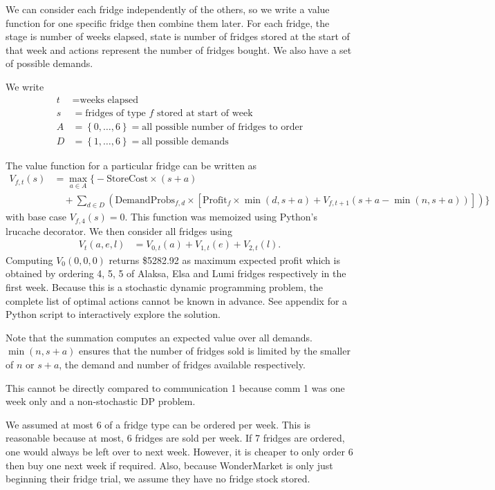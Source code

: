 \documentclass[11pt,a4paper]{article}
\begin{document}
We can consider each fridge independently of the others, so we write a value function 
for one specific fridge then combine them later. For each fridge, 
the stage is number of weeks elapsed, state is number of fridges stored at 
the start of that week and actions represent the number of fridges bought. We also 
have a set of possible demands.

We write 
\begin{align*}
    t &= \text{weeks elapsed} \\ 
    s &= \text{fridges of type $f$ stored at start of week} \\ 
    A &= \left\{ 0, \ldots, 6\right\} = \text{all possible number of fridges to order} \\ 
    D &= \left\{ 1, \ldots, 6\right\} = \text{all possible demands} 
\end{align*}

The value function for a particular fridge can be written as 
\begin{align*}
    V_{f,t}(s) &= \max_{a \in A} 
    \Big\{ -\mathrm{StoreCost}\times(s+a) \\ 
        & \quad + \sum_{d \in D} \left(\mathrm{DemandProbs}_{f,d} \times \left[\mathrm{Profit}_f\times\min(d, s+a)+  V_{f,t+1}(s+a-\min(n, s+a)) \right]\right)
        \Big\}
\end{align*}
with base case $V_{f,4}(s) = 0$. This function was memoized using 
Python's lru{\mathunderscore}cache decorator. We then consider all fridges using 
\begin{align*}
    V_t(a, e, l) &= V_{0,t}(a) + V_{1,t}(e) + V_{2,t}(l).
\end{align*}
Computing $V_0(0,0,0)$ returns \$5282.92 as maximum expected profit which is obtained by 
ordering 4, 5, 5 of Alaksa, Elsa and Lumi fridges respectively in the first week. Because this is 
a stochastic dynamic programming problem, the complete list of optimal actions
cannot be known in advance. See appendix for a Python script to interactively explore the solution.

Note that the summation computes an expected value over all demands.
$\min(n, s+a)$ ensures that the number of fridges sold is limited by the smaller 
of $n$ or $s+a$, the demand and number of fridges available respectively.

This cannot be directly compared to communication 1 because comm 1 was 
one week only and a non-stochastic DP problem. 

We assumed at most 6 of a fridge type can be ordered per week. This is reasonable 
because at most, 6 fridges are sold per week. If 7 fridges are ordered, one would always 
be left over to next week. However, it is cheaper to only order 6 then buy one 
next week if required. Also, because WonderMarket is only just beginning their 
fridge trial, we assume they have no fridge stock stored.
\end{document}
